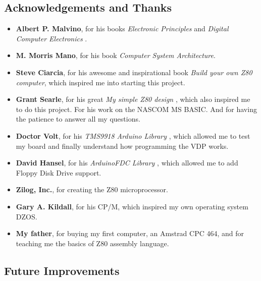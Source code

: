 \documentclass[a4paper,11pt]{article}
\begin{document}
    \subsection{Acknowledgements and Thanks}

    \begin{itemize}
        \item \textbf{Albert P. Malvino}, for his books \textit{Electronic
        Principles}\cite{malvino1} and \textit{Digital Computer Electronics}
        \cite{malvino2}.
        \item \textbf{M. Morris Mano}, for his book \textit{Computer System
        Architecture}\cite{morrismano1}.
        \item \textbf{Steve Ciarcia}, for his awesome and inspirational book
        \textit{Build your own Z80 computer}\cite{ciarcia1}, which inspired me
        into starting this project.
        \item \textbf{Grant Searle}, for his great \textit{My simple Z80 design}
        \cite{searle1}, which also inspired me to do this project. For his work
        on the NASCOM MS BASIC. And for having the patience to answer all my
        questions.
        \item \textbf{Doctor Volt}, for his \textit{TMS9918 Arduino Library}
        \cite{drvolt}, which allowed me to test my board and finally
        understand how programming the VDP works.
        \item \textbf{David Hansel}, for his \textit{ArduinoFDC Library}
        \cite{dhansel}, which allowed me to add Floppy Disk Drive support.
        \item \textbf{Zilog, Inc.}, for creating the Z80 microprocessor.
        \item \textbf{Gary A. Kildall}, for his CP/M, which inspired my own
        operating system DZOS.
        \item \textbf{My father}, for buying my first computer, an Amstrad CPC
        464, and for teaching me the basics of Z80 assembly language.
    \end{itemize}

    \subsection{Future Improvements}
\end{document}
